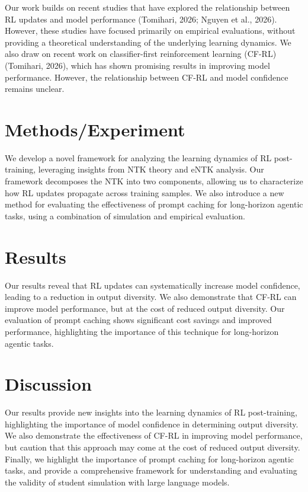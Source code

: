 \documentclass{article}
\begin{document}
Our work builds on recent studies that have explored the relationship between RL updates and model performance (Tomihari, 2026; Nguyen et al., 2026). However, these studies have focused primarily on empirical evaluations, without providing a theoretical understanding of the underlying learning dynamics. We also draw on recent work on classifier-first reinforcement learning (CF-RL) (Tomihari, 2026), which has shown promising results in improving model performance. However, the relationship between CF-RL and model confidence remains unclear.

\section{Methods/Experiment}

We develop a novel framework for analyzing the learning dynamics of RL post-training, leveraging insights from NTK theory and eNTK analysis. Our framework decomposes the NTK into two components, allowing us to characterize how RL updates propagate across training samples. We also introduce a new method for evaluating the effectiveness of prompt caching for long-horizon agentic tasks, using a combination of simulation and empirical evaluation.

\section{Results}

Our results reveal that RL updates can systematically increase model confidence, leading to a reduction in output diversity. We also demonstrate that CF-RL can improve model performance, but at the cost of reduced output diversity. Our evaluation of prompt caching shows significant cost savings and improved performance, highlighting the importance of this technique for long-horizon agentic tasks.

\section{Discussion}

Our results provide new insights into the learning dynamics of RL post-training, highlighting the importance of model confidence in determining output diversity. We also demonstrate the effectiveness of CF-RL in improving model performance, but caution that this approach may come at the cost of reduced output diversity. Finally, we highlight the importance of prompt caching for long-horizon agentic tasks, and provide a comprehensive framework for understanding and evaluating the validity of student simulation with large language models.
\end{document}
